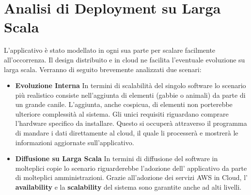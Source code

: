

\chapter{Analisi di Deployment su Larga Scala}
L'applicativo è stato modellato in ogni sua parte per scalare facilmente all'occorrenza. Il design distribuito e in cloud ne facilita l'eventuale evoluzione su larga scala.
Verranno di seguito brevemente analizzati due scenari: 
\begin{itemize}
    \item  \textbf{Evoluzione Interna} In termini di scalabilità del singolo software lo scenario più realistico consiste nell'aggiunta di elementi (gabbie o animali) da parte di un grande canile. L'aggiunta, anche cospicua, di elementi non porterebbe ulteriore complessità al sistema. Gli unici requisiti riguardano comprare l'hardware specifico da installare. Questo si occuperà attraverso il programma di mandare i dati direttamente al cloud, il quale li processerà e mostrerà le informazioni aggiornate sull'applicativo.
    \item  \textbf{Diffusione su Larga Scala} In termini di diffusione del software in molteplici copie lo scenario riguarderebbe l'adozione dell' applicativo da parte di molteplici amministrazioni. Grazie all'adozione dei servizi AWS in Cloud, l' \textbf{availability} e la \textbf{scalability} del sistema sono garantite anche ad alti livelli.
\end{itemize}